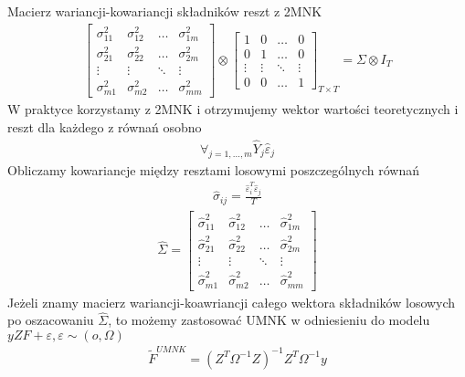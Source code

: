 Macierz wariancji-kowariancji składników reszt z 2MNK
\begin{gather*}
\begin{bmatrix}
	\sigma ^2 _{11} & \sigma ^2 _{12} & \dots  & \sigma ^2 _{1m} \\
	\sigma ^2 _{21} & \sigma ^2 _{22} & \dots  & \sigma ^2 _{2m} \\
	\vdots          & \vdots          & \ddots & \vdots          \\
	\sigma ^2 _{m1} & \sigma ^2 _{m2} & \dots  & \sigma ^2 _{mm}
\end{bmatrix}
\otimes
\begin{bmatrix}
	1      & 0      & \dots  & 0      \\
	0      & 1      & \dots  & 0      \\
	\vdots & \vdots & \ddots & \vdots \\
	0      & 0      & \dots  & 1
\end{bmatrix}_{T\times T}=\Sigma \otimes I_T
\end{gather*}
W praktyce korzystamy z 2MNK i otrzymujemy wektor wartości teoretycznych i reszt dla każdego z równań osobno
\begin{gather*}
\forall_{j=1,\dots,m}\hat Y_j\hat \varepsilon_j
\end{gather*}
Obliczamy kowariancje między resztami losowymi poszczególnych równań
\begin{gather*}
\hat \sigma_{ij}=
\frac{\hat \varepsilon_i^T\hat \varepsilon_j}{T}
\end{gather*}
\begin{gather*}
\hat \Sigma=
\begin{bmatrix}
	\hat \sigma ^2 _{11} & \hat \sigma ^2 _{12} & \dots  & \hat \sigma ^2 _{1m} \\
	\hat \sigma ^2 _{21} & \hat \sigma ^2 _{22} & \dots  & \hat \sigma ^2 _{2m} \\
	\vdots               & \vdots               & \ddots & \vdots               \\
	\hat \sigma ^2 _{m1} & \hat \sigma ^2 _{m2} & \dots  & \hat \sigma ^2 _{mm}
\end{bmatrix}
\end{gather*}
Jeżeli znamy macierz wariancji-koawriancji całego wektora składników losowych po oszacowaniu $ \hat \Sigma $, to możemy zastosować UMNK w odniesieniu do modelu $ yZF+\varepsilon,\varepsilon\sim(o,\Omega) $
\begin{gather*}
\tilde{F}^{UMNK}=
\left(Z^T\Omega^{-1}Z\right)^{-1}
Z^T\Omega^{-1}y
\end{gather*}
